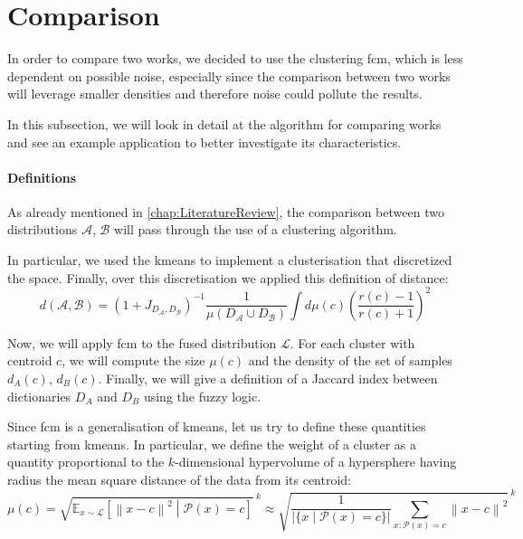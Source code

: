\section{Comparison}
In order to compare two works, we decided to use the clustering \gls{fcm}, which is less dependent on possible noise, especially since the comparison between two works will leverage smaller densities and therefore noise could pollute the results.

\noindent In this subsection, we will look in detail at the algorithm for comparing works and see an example application to better investigate its characteristics.

\paragraph{Definitions}
As already mentioned in \cref{chap:LiteratureReview}, the comparison between two distributions $\mathcal{A}$, $\mathcal{B}$ will pass through the use of a clustering algorithm.

\noindent In particular, we used the \gls{kmeans} to implement a clusterisation that discretized the space. Finally, over this discretisation we applied this definition of distance:
\begin{equation}
	\label{eq:kmeans_dist}
	d(\mathcal{A},\mathcal{B})=(1+J_{D_\mathcal{A},D_\mathcal{B}})^{-1}\frac{1}{\mu(D_\mathcal{A}\cup D_\mathcal{B})}\int d\mu(c) \left(\frac{r(c)-1}{r(c)+1}\right)^2
\end{equation}

\noindent Now, we will apply \gls{fcm} to the fused distribution $\mathcal{L}$. For each cluster with centroid $c$, we will compute the size $\mu(c)$ and the density of the set of samples $d_{A}(c)$, $d_{B}(c)$. Finally, we will give a definition of a Jaccard index between dictionaries $D_A$ and $D_B$ using the fuzzy logic.

\noindent Since \gls{fcm} is a generalisation of \gls{kmeans}, let us try to define these quantities starting from \gls{kmeans}. In particular, we define the weight of a cluster as a quantity proportional to the $k$-dimensional hypervolume of a hypersphere having radius the mean square distance of the data from its centroid:
\begin{equation*}
	\mu(c) = {\sqrt{\mathbb{E}_{x\sim\mathcal{L}}\left[\left\|x-c\right\|^2\middle|\mathcal{P}(x)=c\right]}\,}^{k} \approx {\sqrt{\frac{1}{\left|\{x\middle|\mathcal{P}(x)=c\}\right|}\sum_{x:\mathcal{P}(x)=c}\left\|x-c\right\|^2}\,}^{k}
\end{equation*}

